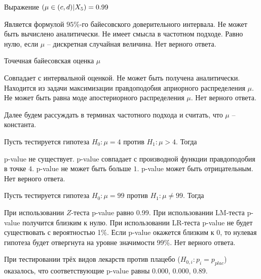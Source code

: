 \documentclass[10pt, a4paper]{exam}
\let\P\relax
\DeclareMathOperator{\P}{\mathbb{P}}
\begin{document}
\begin{questions}
		\question Выражение $\P(\mu \in (c, d) | X_5) = 0.99$
		\begin{choices}
			\choice Является формулой $95\%$-го байесовского доверительного интервала.
			\choice Не может быть вычислено аналитически.
			\choice Не имеет смысла в частотном подходе.
			\choice Равно нулю, если $\mu$ -- дискретная случайная величина.
			\choice Нет верного ответа.
		\end{choices}
	
		\question Точечная байесовская оценка $\mu$
		\begin{choices}
			\choice Совпадает с интервальной оценкой.
			\choice Не может быть получена аналитически.
			\choice Находится из задачи максимизации правдоподобия априорного распределения $\mu$.
			\choice Не может быть равна моде апостериорного распределения $\mu$. 
			\choice Нет верного ответа.
		\end{choices}
		\vspace{1em}
	
		Далее будем рассуждать в терминах частотного подхода и считать, что $\mu$ -- константа.
		\vspace{1em}
		
		\question Пусть тестируется гипотеза $H_0: \mu = 4$ против $H_1: \mu > 4$. Тогда
		\begin{choices}
			\choice p-value не существует.
			\choice p-value совпадает с производной функции правдоподобия в точке $4$.
			\choice p-value не может быть больше $1$.
			\choice p-value может быть отрицательным.
			\choice Нет верного ответа.
		\end{choices}
	
		\question Пусть тестируется гипотеза $H_0: \mu = 99$ против $H_1: \mu \ne 99$. Тогда
		\begin{choices}
			\choice При использовании $Z$-теста p-value равно 0.99.
			\choice При использовании LM-теста p-value получится близким к нулю.
			\choice При использовании LR-теста p-value не будет существовать с вероятностью 1\%.
			\choice Если p-value окажется близким к 0, то нулевая гипотеза будет отвергнута на уровне значимости 99\%. 
			\choice Нет верного ответа.
		\end{choices}
	\end{questions}
	
	При тестировании трёх видов лекарств против плацебо ($H_{0,i}: p_i = p_{plac}$) оказалось, что соответствующие p-value равны 0.000, 0.000, 0.89.
	
\end{document}
